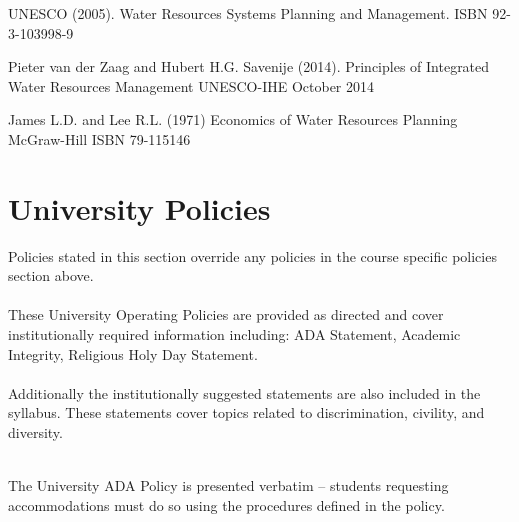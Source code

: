 \documentclass[12pt]{article}
\begin{document}
\clearpage
\begin{thebibliography}{}

  
UNESCO (2005).
\newblock Water Resources Systems Planning and Management.
\newblock ISBN 92-3-103998-9 

Pieter van der Zaag and Hubert H.G. Savenije (2014). 
\newblock Principles of Integrated Water Resources Management
\newblock UNESCO-IHE October 2014

James L.D. and Lee R.L. (1971)
\newblock Economics of Water Resources Planning 
\newblock McGraw-Hill
\newblock ISBN 79-115146 


\section*{University Policies}
Policies stated in this section override any policies in the course specific policies section above.
~\\~\\
These University Operating Policies are provided as directed and cover institutionally required information including: 
ADA Statement, Academic Integrity, Religious Holy Day Statement.
\\~\\
Additionally the institutionally suggested statements are also included in the syllabus.  
These statements cover topics related to discrimination, civility, and diversity.  

~\\The University ADA Policy is presented verbatim -- students requesting accommodations must do so using the procedures defined in the policy.

%
%

\end{thebibliography}
\end{document}
